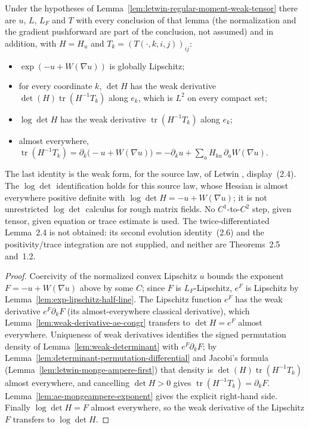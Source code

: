 \begin{lemma}
  \label{lem:letwin-regular-moment-weak-first-ma}
  \leanok
  Under the hypotheses of Lemma~\ref{lem:letwin-regular-moment-weak-tensor} there are $u$, $L$, $L_F$ and $T$ with every conclusion
  of that lemma (the normalization and the gradient pushforward are part of the conclusion, not assumed) and in addition, with
  $H=H_u$ and $T_k=(T(\cdot,k,i,j))_{ij}$:
  \begin{itemize}
    \item $\exp(-u+W(\nabla u))$ is globally Lipschitz;
    \item for every coordinate $k$, $\det H$ has the weak derivative $\det(H)\operatorname{tr}(H^{-1}T_k)$ along $e_k$, which is $L^2$
      on every compact set;
    \item $\log\det H$ has the weak derivative $\operatorname{tr}(H^{-1}T_k)$ along $e_k$;
    \item almost everywhere,
      $\operatorname{tr}(H^{-1}T_k)=\partial_k\bigl(-u+W(\nabla u)\bigr)=-\partial_ku+\sum_aH_{ka}\,\partial_aW(\nabla u)$.
  \end{itemize}
  The last identity is the weak form, for the source law, of Letwin \cite{Letwin2026QuadraticKLS}, display~(2.4). The $\log\det$
  identification holds for this source law, whose Hessian is almost everywhere positive definite with $\log\det H=-u+W(\nabla u)$;
  it is not unrestricted $\log\det$ calculus for rough matrix fields. No $C^1$-to-$C^2$ step, given tensor, given equation or trace
  estimate is used. The twice-differentiated Lemma~2.4 is not obtained: its second evolution identity~(2.6) and the
  positivity/trace integration are not supplied, and neither are Theorems~2.5 and~1.2.
\end{lemma}
\begin{proof}
  \leanok
  Coercivity of the normalized convex Lipschitz $u$ bounds the exponent $F=-u+W(\nabla u)$ above by some $C$; since $F$ is
  $L_F$-Lipschitz, $e^F$ is Lipschitz by Lemma~\ref{lem:exp-lipschitz-half-line}. The Lipschitz function $e^F$ has the weak
  derivative $e^F\partial_kF$ (its almost-everywhere classical derivative), which Lemma~\ref{lem:weak-derivative-ae-congr} transfers to
  $\det H=e^F$ almost everywhere. Uniqueness of weak derivatives identifies the signed permutation density of
  Lemma~\ref{lem:weak-determinant} with $e^F\partial_kF$; by Lemma~\ref{lem:determinant-permutation-differential} and Jacobi's formula
  (Lemma~\ref{lem:letwin-monge-ampere-first}) that density is $\det(H)\operatorname{tr}(H^{-1}T_k)$ almost everywhere, and cancelling
  $\det H>0$ gives $\operatorname{tr}(H^{-1}T_k)=\partial_kF$. Lemma~\ref{lem:ae-mongeampere-exponent} gives the explicit right-hand
  side. Finally $\log\det H=F$ almost everywhere, so the weak derivative of the Lipschitz $F$ transfers to $\log\det H$.
\end{proof}

